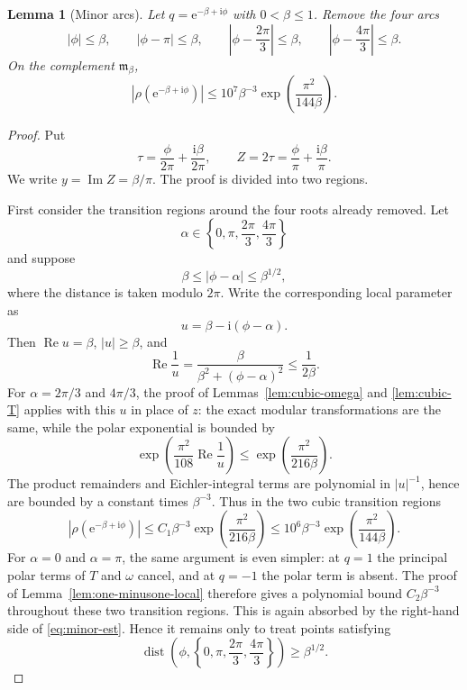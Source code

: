 \documentclass[11pt]{article}
\newtheorem{lemma}[theorem]{Lemma}
\theoremstyle{remark}
\newcommand{\ii}{\mathrm i}
\newcommand{\e}{\mathrm e}
\newcommand{\Repart}{\operatorname{Re}}
\newcommand{\Impart}{\operatorname{Im}}
\begin{document}
\begin{lemma}[Minor arcs]\label{lem:minor-local}
Let $q=\e^{-\beta+\ii\phi}$ with $0<\beta\leq1$.  Remove the four arcs
\[
|\phi|\leq\beta,
\qquad
|\phi-\pi|\leq\beta,
\qquad
\left|\phi-\frac{2\pi}{3}\right|\leq\beta,
\qquad
\left|\phi-\frac{4\pi}{3}\right|\leq\beta.
\]
On the complement $\mathfrak m_\beta$,
\begin{equation}\label{eq:minor-est}
|\rho(\e^{-\beta+\ii\phi})|
\leq10^7\beta^{-3}\exp\left(\frac{\pi^2}{144\beta}\right).
\end{equation}
\end{lemma}

\begin{proof}
Put
\[
\tau=\frac{\phi}{2\pi}+\frac{\ii\beta}{2\pi},
\qquad
Z=2\tau=\frac{\phi}{\pi}+\frac{\ii\beta}{\pi}.
\]
We write $y=\Impart Z=\beta/\pi$.  The proof is divided into two regions.

First consider the transition regions around the four roots already removed.  Let
\[
\alpha\in\left\{0,\pi,\frac{2\pi}{3},\frac{4\pi}{3}\right\}
\]
and suppose
\[
\beta\leq |\phi-\alpha|\leq \beta^{1/2},
\]
where the distance is taken modulo $2\pi$.  Write the corresponding local parameter as
\[
u=\beta-\ii(\phi-\alpha).
\]
Then $\Repart u=\beta$, $|u|\geq\beta$, and
\[
\Repart\frac1u=\frac{\beta}{\beta^2+(\phi-\alpha)^2}\leq\frac1{2\beta}.
\]
For $\alpha=2\pi/3$ and $4\pi/3$, the proof of Lemmas~\ref{lem:cubic-omega} and
\ref{lem:cubic-T} applies with this $u$ in place of $z$: the exact modular
transformations are the same, while the polar exponential is bounded by
\[
\exp\left(\frac{\pi^2}{108}\Repart\frac1u\right)
\leq
\exp\left(\frac{\pi^2}{216\beta}\right).
\]
The product remainders and Eichler-integral terms are polynomial in $|u|^{-1}$, hence are
bounded by a constant times $\beta^{-3}$.  Thus in the two cubic transition regions
\[
|\rho(\e^{-\beta+\ii\phi})|
\leq
C_1\beta^{-3}\exp\left(\frac{\pi^2}{216\beta}\right)
\leq
10^6\beta^{-3}\exp\left(\frac{\pi^2}{144\beta}\right).
\]
For $\alpha=0$ and $\alpha=\pi$, the same argument is even simpler: at $q=1$ the principal
polar terms of $T$ and $\omega$ cancel, and at $q=-1$ the polar term is absent.  The proof of
Lemma~\ref{lem:one-minusone-local} therefore gives a polynomial bound
$C_2\beta^{-3}$ throughout these two transition regions.  This is again absorbed by the
right-hand side of \eqref{eq:minor-est}.  Hence it remains only to treat points satisfying
\begin{equation}\label{eq:far-from-small-cusps}
\operatorname{dist}\left(\phi,\left\{0,\pi,\frac{2\pi}{3},\frac{4\pi}{3}\right\}\right)
\geq \beta^{1/2}.
\end{equation}


\end{proof}
\end{document}
